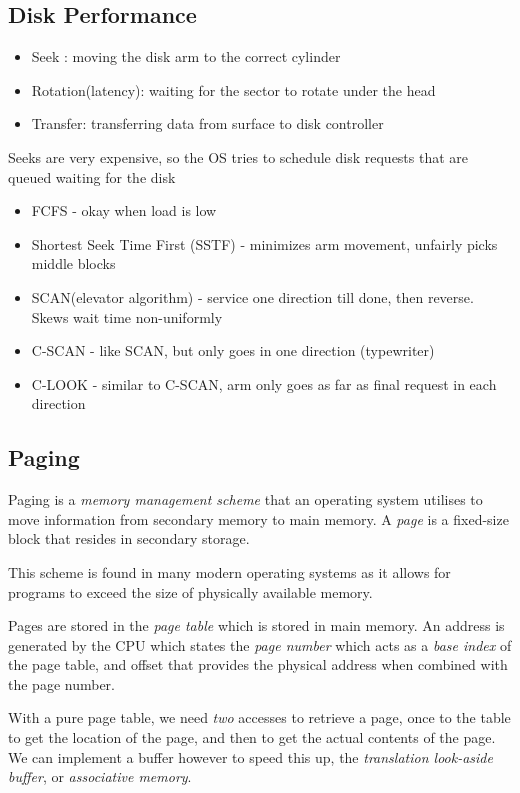 \documentclass[a4]{article}
\begin{document}
\subsection{Disk Performance}
\begin{itemize} 
    \item Seek : moving the disk arm to the correct cylinder
    \item Rotation(latency): waiting for the sector to rotate under the head
    \item Transfer: transferring data from surface to disk controller
\end{itemize}
\vspace{0.5cm}
Seeks are very expensive, so the OS tries to schedule disk requests that are queued waiting for the disk
\begin{itemize}
    \item FCFS - okay when load is low
    \item Shortest Seek Time First (SSTF) - minimizes arm movement, unfairly picks middle blocks
    \item SCAN(elevator algorithm) - service one direction till done, then reverse. Skews wait time non-uniformly
    \item C-SCAN - like SCAN, but only goes in one direction (typewriter)
    \item C-LOOK - similar to C-SCAN, arm only goes as far as final request in each direction
\end{itemize}

\subsection{Paging}

Paging is a \textit{memory management scheme} that an operating system utilises to move information from secondary memory to main memory. A \textit{page} is a fixed-size block that resides in secondary storage.

This scheme is found in many modern operating systems as it allows for programs to exceed the size of physically available memory.

Pages are stored in the \textit{page table} which is stored in main memory. An address is generated by the CPU which states the \textit{page number} which acts as a \textit{base index} of the page table, and offset that provides the physical address when combined with the page number.

With a pure page table, we need \textit{two} accesses to retrieve a page, once to the table to get the location of the page, and then to get the actual contents of the page. We can implement a buffer however to speed this up, the \textit{translation look-aside buffer}, or \textit{associative memory}.
\end{document}
